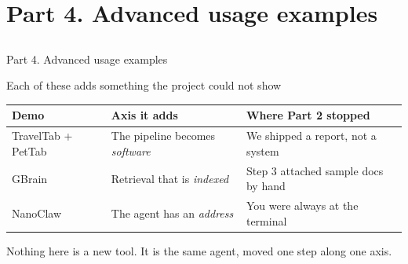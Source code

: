 \section{Part 4. Advanced usage examples}\subsection{}

\begin{transitionframe}
Part 4. Advanced usage examples
\end{transitionframe}

\begin{frame}{Each of these adds something the project could not show}
\begin{center}
\tabfont
\begin{tabular}{lll}
\toprule
Demo & Axis it adds & Where Part 2 stopped \\
\midrule
TravelTab + PetTab & The pipeline becomes \emph{software} & We shipped a report, not a system \\
GBrain    & Retrieval that is \emph{indexed} & Step 3 attached sample docs by hand \\
NanoClaw  & The agent has an \emph{address}  & You were always at the terminal \\
\bottomrule
\end{tabular}
\end{center}
\vs
Nothing here is a new tool. It is the same agent, moved one step along one axis.
\end{frame}


